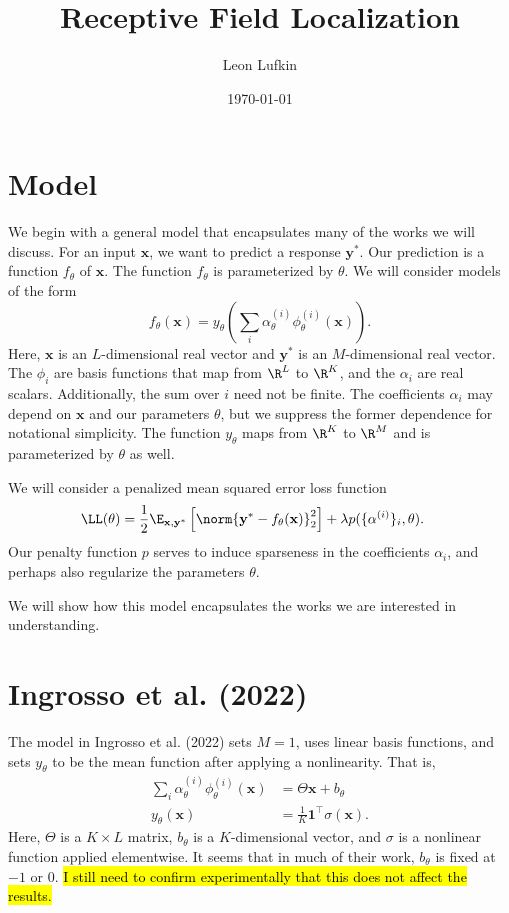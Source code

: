 \documentclass{article}
\title{Receptive Field Localization}
\author{Leon Lufkin}
\date{\today}
\begin{document}
\section{Model}
We begin with a general model that encapsulates many of the works we will discuss.
For an input $\mathbf{x}$, we want to predict a response $\mathbf{y}^*$.
Our prediction is a function $f_\theta$ of $\mathbf{x}$.
The function $f_\theta$ is parameterized by $\theta$.
We will consider models of the form
\begin{equation}
  \label{eq:general_model}
  f_\theta(\mathbf{x}) = y_\theta \left( \sum_i \alpha_\theta^{(i)} \phi_\theta^{(i)} (\mathbf{x}) \right).
\end{equation}
Here, $\mathbf{x}$ is an $L$-dimensional real vector and $\mathbf{y}^*$ is an $M$-dimensional real vector.
The $\phi_i$ are basis functions that map from $\R^L$ to $\R^K$, and the $\alpha_i$ are real scalars.
Additionally, the sum over $i$ need not be finite.
The coefficients $\alpha_i$ may depend on $\mathbf{x}$ and our parameters $\theta$, but we suppress the former dependence for notational simplicity. 
The function $y_\theta$ maps from $\R^K$ to $\R^M$ and is parameterized by $\theta$ as well.

We will consider a penalized mean squared error loss function
\begin{align}
  \LL(\theta) &= \frac{1}{2} \E_{\mathbf{x}, \mathbf{y}^*} \left[  \norm{ \mathbf{y}^* - f_\theta(\mathbf{x}) }_2^2  \right] + \lambda p(\{ \alpha^{(i)} \}_i, \theta).
\end{align}
Our penalty function $p$ serves to induce sparseness in the coefficients $\alpha_i$, and perhaps also regularize the parameters $\theta$.

We will show how this model encapsulates the works we are interested in understanding.

\section{Ingrosso et al. (2022)}
The model in Ingrosso et al. (2022) sets $M = 1$, uses linear basis functions, and sets $y_\theta$ to be the mean function after applying a nonlinearity.
That is,
\begin{align}
  \sum_i \alpha_\theta^{(i)} \phi_\theta^{(i)} (\mathbf{x}) &= \Theta \mathbf{x} + b_\theta \\
  y_\theta(\mathbf{x}) &= \frac{1}{K} \bm{1}^\top \sigma(\mathbf{x}).
\end{align}
Here, $\Theta$ is a $K \times L$ matrix, $b_\theta$ is a $K$-dimensional vector, and $\sigma$ is a nonlinear function applied elementwise.
It seems that in much of their work, $b_\theta$ is fixed at $-1$ or $0$. %
\hl{I still need to confirm experimentally that this does not affect the results.}
\end{document}
